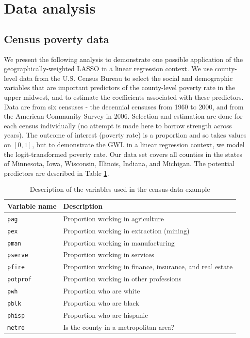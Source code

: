 \documentclass[authoryear, review, 11pt]{elsarticle}
\begin{document}
	



			
\section{Data analysis}
	\subsection{Census poverty data}
	We present the following analysis to demonstrate one possible application of the geographically-weighted LASSO in a linear regression context. We use county-level data from the U.S. Census Bureau to select the social and demographic variables that are important predictors of the county-level poverty rate in the upper midwest, and to estimate the coefficients associated with these predictors. Data are from six censuses - the decennial censuses from 1960 to 2000, and from the American Community Survey in 2006. Selection and estimation are done for each census individually (no attempt is made here to borrow strength across years). The outcome of interest (poverty rate) is a proportion and so takes values on $[0,1]$, but to demonstrate the GWL in a linear regression context, we model the logit-transformed poverty rate. Our data set covers all counties in the states of Minnesota, Iowa, Wisconsin, Illinois, Indiana, and Michigan. The potential predictors are described in Table \ref{table:census-vars}.\\
	
	\begin{table}
		\begin{center}
		\begin{tabular}{ll}
			Variable name & Description \\
			\hline
			\verb!pag! & Proportion working in agriculture\\
			\verb!pex! &  Proportion working in extraction (mining)\\
			\verb!pman! & Proportion working in manufacturing \\
			\verb!pserve! & Proportion working in services \\
			\verb!pfire! & Proportion working in finance, insurance, and real estate \\
			\verb!potprof! & Proportion working in other professions \\
			\verb!pwh! & Proportion who are white \\
			\verb!pblk! & Proportion who are black \\
			\verb!phisp! & Proportion who are hispanic \\
			\verb!metro! & Is the county in a metropolitan area?\\
		\end{tabular}
		\caption{Description of the variables used in the census-data example\label{table:census-vars}}
		\end{center}		
	\end{table}
	
\end{document}
